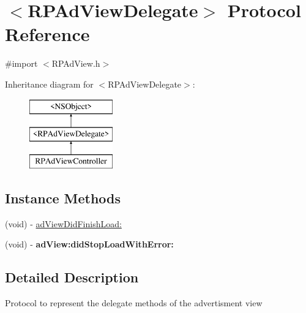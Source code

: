 \hypertarget{protocol_r_p_ad_view_delegate-p}{\section{$<$R\-P\-Ad\-View\-Delegate$>$ Protocol Reference}
\label{protocol_r_p_ad_view_delegate-p}
}


{\ttfamily \#import $<$R\-P\-Ad\-View.\-h$>$}

Inheritance diagram for $<$R\-P\-Ad\-View\-Delegate$>$\-:\begin{figure}[H]
\begin{center}
\leavevmode
\includegraphics[height=3.000000cm]{protocol_r_p_ad_view_delegate-p}
\end{center}
\end{figure}
\subsection*{Instance Methods}
\begin{DoxyCompactItemize}
\item 
(void) -\/ \hyperlink{protocol_r_p_ad_view_delegate-p_a7e614215408dc22abfa51bc315622fd9}{ad\-View\-Did\-Finish\-Load\-:}
\item 
\hypertarget{protocol_r_p_ad_view_delegate-p_a0a9c7c71116e31569fe4b9f5712f2768}{(void) -\/ {\bfseries ad\-View\-:did\-Stop\-Load\-With\-Error\-:}}\label{protocol_r_p_ad_view_delegate-p_a0a9c7c71116e31569fe4b9f5712f2768}

\end{DoxyCompactItemize}


\subsection{Detailed Description}
Protocol to represent the delegate methods of the advertisment view 

